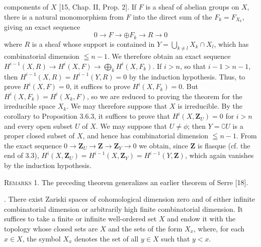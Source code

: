
\noindent components of $X$ [15, Chap. II, Prop. 2]. If $F$ is a sheaf of
abelian groups on $X$, there is a natural monomorphism from $F$ into the
direct sum of the $F_k=F_{X_k}$, giving an exact sequence
\[
0\to F\to\oplus F_k\to R
\to0
\]
where $R$ is a sheaf whose support is contained in
$Y=\displaystyle\bigcup\limits_{k\ne l}X_k\cap X_l$,
which has combinatorial dimension $\leqq n-1$. We therefore obtain an exact
sequence
$H^{i-1}(X,R)\to H^i(X,F)\to\displaystyle\bigoplus\limits_k H^i(X,F_k)$.
If $i>n$, so that $i-1>n-1$, then
$H^{i-1}(X,R)=H^{i-1}(Y,R)=0$ by the induction hypothesis. Thus, to prove
$H^i(X,F)=0$, it suffices to prove $H^i(X,F_k)=0$. But
$H^i(X,F_k)=H^i(X_k,F)$,
so we are reduced to proving the theorem for the irreducible space $X_k$.
We may therefore suppose that $X$ is irreducible. By the corollary to
Proposition 3.6.3, it suffices to prove that $H^i(X,\mathbf Z_U)=0$ for $i>n$ and
every open subset $U$ of $X$. We may suppose that $U\ne\phi$; then
$Y=\complement U$ is a proper closed subset of $X$, and hence has combinatorial
dimension $\leqq n-1$. From the exact sequence
$0\to \mathbf Z_U\to \mathbf Z\to \mathbf Z_Y\to0$
we obtain, since $\mathbf Z$ is flasque (cf. the end of 3.3),
$H^i(X,\mathbf Z_U)=H^{i-1}(X,\mathbf Z_Y)=H^{i-1}(Y,\mathbf Z)$,
which again vanishes by the induction hypothesis.

\indent\textsc{Remarks} 1. The preceding theorem generalizes an earlier
theorem of Serre [18].

. There exist Zariski spaces of cohomological dimension zero and
of either infinite combinatorial dimension or arbitrarily high finite
combinatorial dimension.
It suffices to take a finite or infinite well-ordered set $X$ and endow it
with the topology whose closed sets are $X$ and the sets of the form $X_x$, where,
for each $x\in X$, the symbol $X_x$ denotes the set of all $y\in X$ such that
$y<x$.


